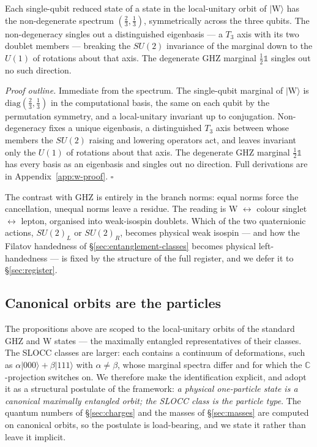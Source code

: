 \begin{proposition}\label{prop:w-doublet}
Each single-qubit reduced state of a state in the local-unitary orbit of $\lvert\mathrm{W}\rangle$
has the non-degenerate spectrum $(\tfrac23,\tfrac13)$, symmetrically across the three qubits. The
non-degeneracy singles out a distinguished eigenbasis --- a $T_3$ axis with its two doublet members
--- breaking the $SU(2)$ invariance of the marginal down to the $U(1)$ of rotations about that axis.
The degenerate GHZ marginal $\tfrac12\mathbb{1}$ singles out no such direction.
\end{proposition}

\emph{Proof outline.} Immediate from the spectrum. The single-qubit marginal of
$\lvert\mathrm{W}\rangle$ is $\mathrm{diag}(\tfrac23,\tfrac13)$ in the computational basis, the
same on each qubit by the permutation symmetry, and a local-unitary invariant up to conjugation.
Non-degeneracy fixes a unique eigenbasis, a distinguished $T_3$ axis between whose members the
$SU(2)$ raising and lowering operators act, and leaves invariant only the $U(1)$ of rotations about
that axis. The degenerate GHZ marginal $\tfrac12\mathbb{1}$ has every basis as an eigenbasis and
singles out no direction. Full derivations are in Appendix~\ref{app:w-proof}. \hfill$\square$

The contrast with GHZ is entirely in the branch norms: equal norms force the cancellation, unequal
norms leave a residue. The reading is W $\leftrightarrow$ colour singlet $\leftrightarrow$ lepton,
organised into weak-isospin doublets. Which of the two quaternionic actions, $SU(2)_L$ or $SU(2)_R$,
becomes physical weak isospin --- and how the Filatov handedness of \S\ref{sec:entanglement-classes}
becomes physical left-handedness --- is fixed by the structure of the full register, and we defer it
to \S\ref{sec:register}.

\subsection{Canonical orbits are the particles}
\label{sec:canonical-orbits}

The propositions above are scoped to the local-unitary orbits of the standard GHZ and W states ---
the maximally entangled representatives of their classes. The SLOCC classes are larger: each contains
a continuum of deformations, such as $\alpha\lvert000\rangle+\beta\lvert111\rangle$ with
$\alpha\neq\beta$, whose marginal spectra differ and for which the $\mathbb{C}$-projection switches
on. We therefore make the identification explicit, and adopt it as a structural postulate of the
framework: \emph{a physical one-particle state is a canonical maximally entangled orbit; the SLOCC
class is the particle type}. The quantum numbers of \S\ref{sec:charges} and the masses of
\S\ref{sec:masses} are computed on canonical orbits, so the postulate is load-bearing, and we state
it rather than leave it implicit.

